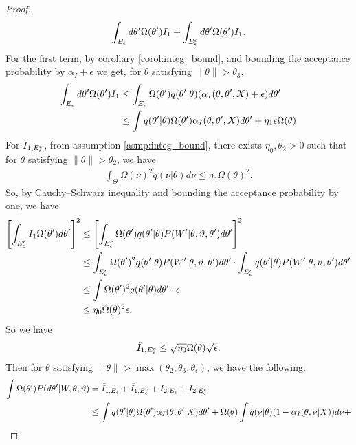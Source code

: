 \begin{proof}
$$\int_{E_\epsilon} d\theta' \Omega(\theta') I_1 +
\int_{E_\epsilon^c} d\theta' \Omega(\theta') I_1.
  $$
For the first term, by corollary \ref{corol:integ_bound}, and bounding
the acceptance probability by $\alpha_I + \epsilon$ we get, for $\theta$ satisfying $ \parallel \theta \parallel > \theta_3$,
\begin{align*}
\int_{E_\epsilon} d\theta' \Omega(\theta') I_1  &
 \leq \int_{E_\epsilon} \Omega(\theta')q(\theta' | \theta) (\alpha_I(\theta, \theta', X) + \epsilon) d\theta' \\
& \leq \int q(\theta' | \theta) \Omega(\theta')\alpha_I(\theta, \theta', X) d\theta' + \eta_1 \epsilon \Omega(\theta)
\end{align*}
For $\tilde{I}_{1,E^c_\epsilon}$, from assumption \ref{asmp:integ_bound}, there exists $\eta_0 , \theta_2 > 0$ such that for $\theta$ satisfying $ \parallel \theta \parallel > \theta_2$, we have
\begin{align*}
\int_\Theta \Omega(\nu)^2 q(\nu | \theta)d\nu \leq \eta_0 \Omega(\theta)^2.
\end{align*}
So, by Cauchy–Schwarz inequality and bounding the acceptance probability by one, we have
\begin{align*}
\left[  \int_{E_\epsilon^c} I_1 \Omega(\theta') d\theta' \right]^2
& \le \left[  \int_{E_\epsilon^c}  \Omega(\theta') q(\theta' | \theta) P(W' | \theta, \vartheta, \theta')d\theta' \right]^2\\
& \le \int_{E_\epsilon^c}  \Omega(\theta')^2 q(\theta' | \theta) P(W' | \theta, \vartheta, \theta')d\theta' \cdot \int_{E_\epsilon^c} q(\theta' | \theta) P(W' | \theta, \vartheta, \theta')d\theta' \\
& \le  \int  \Omega(\theta')^2 q(\theta' | \theta)d\theta' \cdot \epsilon \\
& \le  \eta_0 \Omega(\theta)^2 \epsilon.
\end{align*}
So we have
\begin{align*}
\tilde{I}_{1,E_\epsilon^c} \le \sqrt{\eta_0}\Omega(\theta) \sqrt{\epsilon}.
\end{align*}
Then for $\theta$ satisfying $ \parallel \theta \parallel >\max(\theta_2, \theta_3, \theta_\epsilon)$, we have the following.
\begin{align*}
  \int \Omega(\theta') P(d\theta'| W, \theta, \vartheta)
  &= \tilde{I}_{1,\E_\epsilon} + \tilde{I}_{1,\E^c_\epsilon} + I_{2,\E_{\epsilon}} + I_{2,\E_{\epsilon}^c} \\
  & \leq \int q(\theta' | \theta) \Omega(\theta')\alpha_I(\theta, \theta'| X) d\theta'  + \Omega(\theta)\int  q(\nu | \theta) (1 - \alpha_I(\theta, \nu | X)) d\nu+ \\

\end{align*}
\end{proof}
